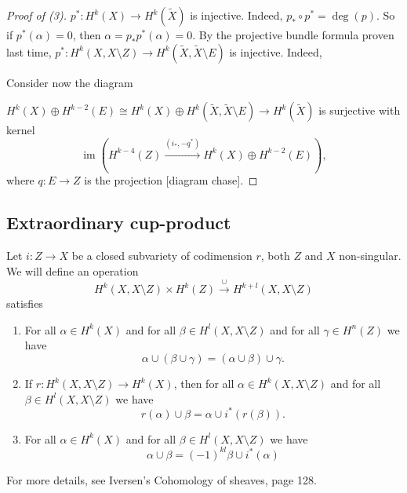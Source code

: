 \documentclass[A4paper, british]{amsart}
\theoremstyle{darkgreentheorem}
\theoremstyle{darkbluedefinition}
\theoremstyle{darkredexample}
\theoremstyle{remark}
\DeclareMathOperator{\im}{im}
\newcommand{\1}{\mathbbm{1}}
\newcommand{\op}{\oplus}
\begin{document}
\begin{proof}[Proof of (3)]
    $p^{*}\colon H^{k}(X)\to H^{k}(\tilde{X})$ is injective.
    Indeed, $p_{*}\circ p^{*}=\deg(p)$.
    So if $p^{*}(\alpha)=0$, then $\alpha=p_{*}p^{*}(\alpha)=0$.
    By the projective bundle formula proven last time, $p^{*}\colon H^{k}(X,X\setminus Z)\to H^{k}(\tilde{X},\tilde{X}\setminus E)$ is injective.
    Indeed,
    \begin{center}
    \end{center}
    Consider now the diagram
    \begin{center}
    \end{center}
    $H^{k}(X)\op H^{k-2}(E)\cong H^{k}(X)\op H^{k}(\tilde{X},\tilde{X}\setminus E)\to H^{k}(\tilde{X})$ is surjective with kernel
    \[ \im(H^{k-4}(Z)\xrightarrow{(i_{*},-q^{*})} H^{k}(X)\op H^{k-2}(E)), \]
    where $q\colon E\to Z$ is the projection [diagram chase].
\end{proof}

\subsection{Extraordinary cup-product}

Let $i\colon Z\to X$ be a closed subvariety of codimension $r$, both $Z$ and $X$ non-singular.
We will define an operation
\[ H^{k}(X,X\setminus Z)\times H^{k}(Z)\xrightarrow{\cup} H^{k+l}(X,X\setminus Z) \]
satisfies
\begin{enumerate}
    \item For all $\alpha\in H^{k}(X)$ and for all $\beta\in H^{l}(X,X\setminus Z)$ and for all $\gamma\in H^{n}(Z)$ we have
	\[ \alpha\cup (\beta \cup \gamma)=(\alpha \cup \beta)\cup \gamma. \]
    \item If $r\colon H^{k}(X,X\setminus Z)\to H^{k}(X)$, then for all $\alpha\in H^{k}(X,X\setminus Z)$ and for all $\beta \in H^{l}(X,X\setminus Z)$ we have
	\[ r(\alpha)\cup \beta=\alpha\cup i^{*}(r(\beta)). \]
    \item For all $\alpha\in H^{k}(X)$ and for all $\beta\in H^{l}(X,X\setminus Z)$ we have 
	\[ \alpha\cup \beta=(-1)^{kl}\beta\cup i^{*}(\alpha) \]
\end{enumerate}
For more details, see Iversen's Cohomology of sheaves, page 128.
\end{document}

